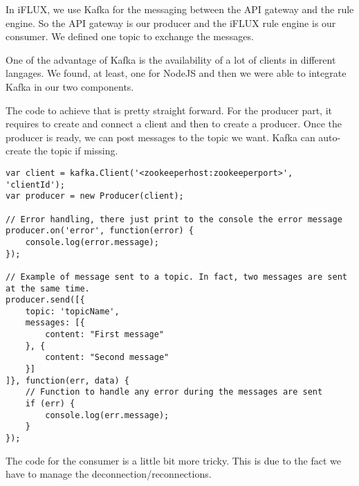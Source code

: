 In iFLUX, we use Kafka for the messaging between the API gateway and the rule engine. So the API gateway is our producer and the iFLUX rule engine is our consumer. We defined one topic to exchange the messages.

One of the advantage of Kafka is the availability of a lot of clients in different langages. We found, at least, one for NodeJS and then we were able to integrate Kafka in our two components.

The code to achieve that is pretty straight forward. For the producer part, it requires to create and connect a client and then to create a producer. Once the producer is ready, we can post messages to the topic we want. Kafka can auto-create the topic if missing.

\begin{lstlisting}
var client = kafka.Client('<zookeeperhost:zookeeperport>', 'clientId');
var producer = new Producer(client);

// Error handling, there just print to the console the error message
producer.on('error', function(error) {
	console.log(error.message);
});

// Example of message sent to a topic. In fact, two messages are sent at the same time.
producer.send([{ 
	topic: 'topicName', 
	messages: [{
		content: "First message"
	}, {
		content: "Second message"
	}]
]}, function(err, data) {
	// Function to handle any error during the messages are sent
	if (err) {
		console.log(err.message);
	}
});
\end{lstlisting}

The code for the consumer is a little bit more tricky. This is due to the fact we have to manage the deconnection/reconnections.


